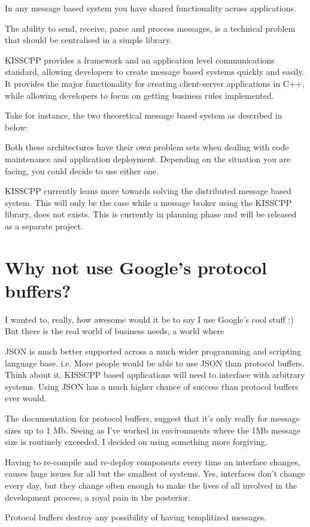 In any message based system you have shared functionality across applications.

The ability to send, receive, parse and process messages, is a technical problem that should be centralised in a simple library.

K\-I\-S\-S\-C\-P\-P provides a framework and an application level communications standard, allowing developers to create message based systems quickly and easily. It provides the major functionality for creating client-\/server applications in C++, while allowing developers to focus on getting business rules implemented.

Take for instance, the two theoretical message based system as described in below\-:





Both these architectures have their own problem sets when dealing with code maintenance and application deployment. Depending on the situation you are facing, you could decide to use either one.

K\-I\-S\-S\-C\-P\-P currently leans more towards solving the distributed message based system. This will only be the case while a message broker using the K\-I\-S\-S\-C\-P\-P library, does not exists. This is currently in planning phase and will be released as a separate project.

\section*{Why not use Google's protocol buffers?}

I wanted to, really, how awesome would it be to say I use Google's cool stuff \-:) But there is the real world of business needs, a world where


\begin{DoxyEnumerate}
\item J\-S\-O\-N is much better supported across a much wider programming and scripting language base. i.\-e. More people would be able to use J\-S\-O\-N than protocol buffers. Think about it. K\-I\-S\-S\-C\-P\-P based applications will need to interface with arbitrary systems. Using J\-S\-O\-N has a much higher chance of success than protocol buffers ever would.
\item The documentation for protocol buffers, suggest that it's only really for message sizes up to 1 Mb. Seeing as I've worked in environments where the 1\-Mb message size is routinely exceeded, I decided on using something more forgiving.
\item Having to re-\/compile and re-\/deploy components every time an interface changes, causes huge issues for all but the smallest of systems. Yes, interfaces don't change every day, but they change often enough to make the lives of all involved in the development process, a royal pain in the posterior.
\item Protocol buffers destroy any possibility of having templitized messages.
\end{DoxyEnumerate}

